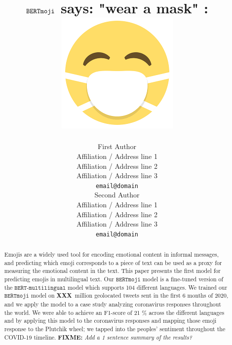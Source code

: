 \documentclass[11pt]{article}
\title{$\bertmoji$ says: "wear a mask" :  \includegraphics[scale=0.07]{images/mask_photo.png}}
\author{First Author \\
  Affiliation / Address line 1 \\
  Affiliation / Address line 2 \\
  Affiliation / Address line 3 \\
  {\tt email@domain} \\\And
  Second Author \\
  Affiliation / Address line 1 \\
  Affiliation / Address line 2 \\
  Affiliation / Address line 3 \\
  {\tt email@domain} \\}
\date{}
\newcommand{\fixme}[1]{{\color{red} \textbf{FIXME:} {\textit {#1}}}}
\newcommand{\XXX}{\textbf{XXX}~}
\newcommand{\bertmoji}{\texttt{BERTmoji}}
\newcommand{\bert}{\texttt{BERT-multilingual}}
\begin{document}
\maketitle
\begin{abstract}
    Emojis are a widely used tool for encoding emotional content in informal messages,
    and predicting which emoji corresponds to a piece of text can be used as a proxy for measuring the emotional content in the text.
    This paper presents the first model for predicting emojis in multilingual text.
    Our $\bertmoji$ model is a fine-tuned version of the $\bert$ model which supports 104 different languages.
    We trained our $\bertmoji$ model on \XXX million geolocated tweets sent in the first 6 months of 2020,
    and we apply the model to a case study analyzing coronavirus responses throughout the world. We were able to achieve an F1-score of 21 \% across the different languages and by applying this model to the coronavirus responses and mapping those emoji response to the Plutchik wheel; we tapped into the peoples' sentiment throughout the COVID-19 timeline. 
    \fixme{Add a 1 sentence summary of the results?}
\end{abstract}

%
% 
\end{document}

